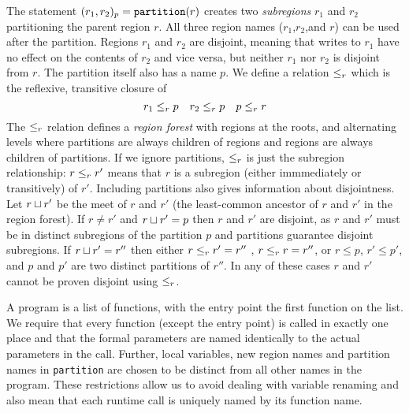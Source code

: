 The statement $(r_1, r_2)_{p} = \mbox{\tt partition}(r)$ creates two
{\em subregions} $r_1$ and $r_2$ partitioning the parent region $r$.
All three region names ($r_1$,$r_2$,and $r$) can be used after the
partition.  Regions $r_1$ and $r_2$ are disjoint, meaning that writes
to $r_1$ have no effect on the contents of $r_2$ and vice versa, but
neither $r_1$ nor $r_2$ is disjoint from $r$.  The partition itself
also has a name $p$.  We define a relation $\leq_r$ which is the
reflexive, transitive closure of
\[ r_1 \leq_r p \ \ \ r_2 \leq_r p \ \ \ p \leq_r r \]
The $\leq_r$ relation defines a {\em region forest} with regions at the
roots, and alternating levels where partitions are always children of
regions and regions are always children of partitions.  If we ignore
partitions, $\leq_r$ is just the subregion relationship: $r \leq_r r'$
means that $r$ is a subregion (either immmediately or transitively) of
$r'$.  Including partitions also gives information about disjointness.
Let $r \sqcup r'$ be the meet of $r$ and $r'$ (the least-common
ancestor of $r$ and $r'$ in the region forest).  If $r \neq r'$ and
$r \sqcup r' = p$ then $r$ and $r'$ are disjoint, as $r$ and $r'$ must
be in distinct subregions of the partition $p$ and partitions
guarantee disjoint subregions.  If $r \sqcup r' = r''$ then either $r
\leq_r r' = r''$ , $r \leq_r r = r''$, or $r \leq p$, $r' \leq p'$, and
$p$ and $p'$ are two distinct partitions of $r''$.  In any of these
cases $r$ and $r'$ cannot be proven disjoint using $\leq_r$.


A program is a list of functions, with the entry point the first
function on the list.  We require that every function (except
the entry point) is called in exactly one place and that the formal
parameters are named identically to the actual parameters in the
call.  Further, local variables, new region names and
partition names in {\tt partition} are chosen to be distinct from all
other names in the program.  These restrictions allow us to avoid
dealing with variable renaming and also mean that each runtime call is
uniquely named by its function name.  

